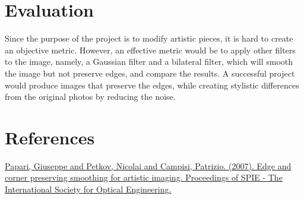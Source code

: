 \documentclass[10pt,twocolumn,letterpaper]{article}
\begin{document}
\section{Evaluation}
Since the purpose of the project is to modify artistic pieces, it is hard to create an objective metric. However, an effective metric would be to apply other filters to the image, namely, a Gaussian filter and a bilateral filter, which will smooth the image but not preserve edges, and compare the results. A successful project would produce images that preserve the edges, while creating stylistic differences from the original photos by reducing the noise.

\section{References}
\href{https://www.researchgate.net/publication/221226072_Edge_and_corner_preserving_smoothing_for_artistic_imaging}{Papari, Giuseppe and Petkov, Nicolai and Campisi, Patrizio. (2007). Edge and corner preserving smoothing for artistic imaging. Proceedings of SPIE - The International Society for Optical Engineering.}
\end{document}

